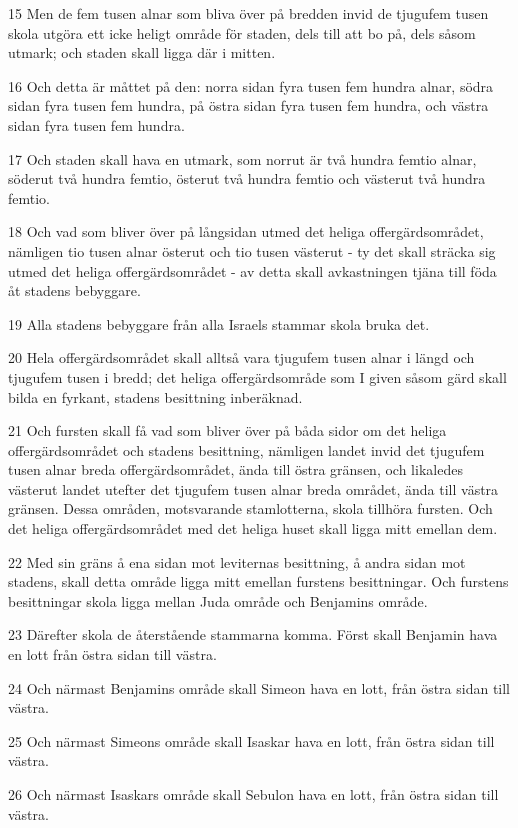 \par 15 Men de fem tusen alnar som bliva över på bredden invid de tjugufem tusen skola utgöra ett icke heligt område för staden, dels till att bo på, dels såsom utmark; och staden skall ligga där i mitten.
\par 16 Och detta är måttet på den: norra sidan fyra tusen fem hundra alnar, södra sidan fyra tusen fem hundra, på östra sidan fyra tusen fem hundra, och västra sidan fyra tusen fem hundra.
\par 17 Och staden skall hava en utmark, som norrut är två hundra femtio alnar, söderut två hundra femtio, österut två hundra femtio och västerut två hundra femtio.
\par 18 Och vad som bliver över på långsidan utmed det heliga offergärdsområdet, nämligen tio tusen alnar österut och tio tusen västerut - ty det skall sträcka sig utmed det heliga offergärdsområdet - av detta skall avkastningen tjäna till föda åt stadens bebyggare.
\par 19 Alla stadens bebyggare från alla Israels stammar skola bruka det.
\par 20 Hela offergärdsområdet skall alltså vara tjugufem tusen alnar i längd och tjugufem tusen i bredd; det heliga offergärdsområde som I given såsom gärd skall bilda en fyrkant, stadens besittning inberäknad.
\par 21 Och fursten skall få vad som bliver över på båda sidor om det heliga offergärdsområdet och stadens besittning, nämligen landet invid det tjugufem tusen alnar breda offergärdsområdet, ända till östra gränsen, och likaledes västerut landet utefter det tjugufem tusen alnar breda området, ända till västra gränsen. Dessa områden, motsvarande stamlotterna, skola tillhöra fursten. Och det heliga offergärdsområdet med det heliga huset skall ligga mitt emellan dem.
\par 22 Med sin gräns å ena sidan mot leviternas besittning, å andra sidan mot stadens, skall detta område ligga mitt emellan furstens besittningar. Och furstens besittningar skola ligga mellan Juda område och Benjamins område.
\par 23 Därefter skola de återstående stammarna komma. Först skall Benjamin hava en lott från östra sidan till västra.
\par 24 Och närmast Benjamins område skall Simeon hava en lott, från östra sidan till västra.
\par 25 Och närmast Simeons område skall Isaskar hava en lott, från östra sidan till västra.
\par 26 Och närmast Isaskars område skall Sebulon hava en lott, från östra sidan till västra.

